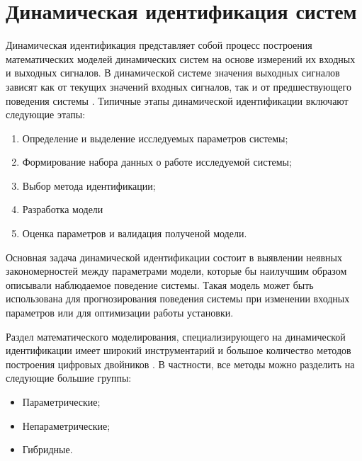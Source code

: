 \chapter{Динамическая идентификация систем}

Динамическая идентификация представляет собой процесс построения математических
моделей динамических систем на основе измерений их входных и выходных сигналов.
В динамической системе значения выходных сигналов зависят как от текущих
значений входных сигналов, так и от предшествующего поведения системы
\cite{bb:identification}. Типичные этапы динамической идентификации включают
следующие этапы: 

\begin{enumerate}
  \item Определение и выделение исследуемых параметров системы;
  \item Формирование набора данных о работе исследуемой системы;
  \item Выбор метода идентификации;
  \item Разработка модели
  \item Оценка параметров и валидация полученой модели.
\end{enumerate}

Основная задача динамической идентификации состоит в выявлении неявных
закономерностей между параметрами модели, которые бы наилучшим образом
описывали наблюдаемое поведение системы. Такая модель может быть использована
для прогнозирования поведения системы при изменении входных параметров или для
оптимизации работы установки. 

Раздел математического моделирования, специализирующего на динамической
идентификации имеет широкий инструментарий и большое количество методов
построения цифровых двойников \cite{bib:ident:autoregr}. В частности, 
все методы можно разделить на следующие большие группы:

\begin{itemize}
  \item Параметрические;
  \item Непараметрические;
  \item Гибридные.
\end{itemize}

